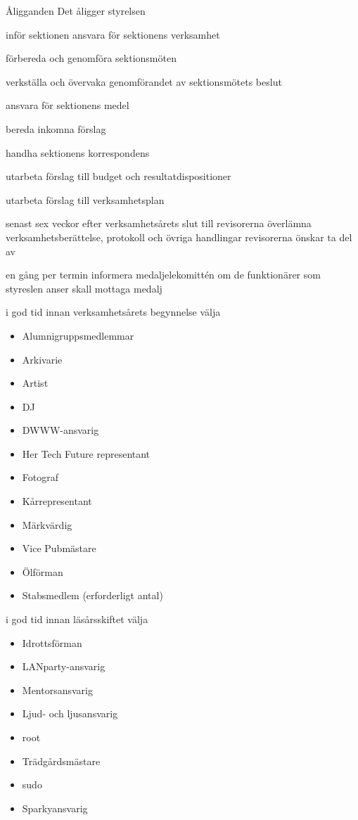 \documentclass[pdfbookmarks,a4paper,11pt]{article}
\newlength{\itemcollength}
\newenvironment{reglemlista}{%
  \begin{list}{}{%
      \setlength{\labelwidth}{\itemcollength}%
      \setlength{\leftmargin}{\labelwidth + \labelsep}%
      \renewcommand{\makelabel}[1]{%
        \raisebox{0pt}[1ex][0pt]{%
          \makebox[\labelwidth][l]{%
            \parbox[t]{\itemcollength}{%
              \raggedright\hspace{0pt}##1}}}\hfill}%
      }}{%
  \end{list}}
\begin{document}
\begin{reglemlista}

	\item[Åligganden]
	Det åligger styrelsen
	\begin{attlista}
		\item inför sektionen ansvara för sektionens verksamhet
		\item förbereda och genomföra sektionsmöten
		\item verkställa och övervaka genomförandet av sektionsmötets beslut
		\item ansvara för sektionens medel
		\item bereda inkomna förslag
		\item handha sektionens korrespondens
		\item utarbeta förslag till budget och resultatdispositioner
		\item utarbeta förslag till verksamhetsplan
		\item senast sex veckor efter verksamhetsårets slut till revisor\-erna överlämna verksamhetsberättelse, protokoll och övriga handlingar revisorerna önskar ta del av
		\item en gång per termin informera medaljelekomittén om de funktionärer som styreslen anser skall mottaga medalj
		\item i god tid innan verksamhetsårets begynnelse välja
		\begin{itemize}
			\item Alumnigruppsmedlemmar
			\item Arkivarie
			\item Artist
			\item DJ
			\item DWWW-ansvarig
			\item Her Tech Future representant
			\item Fotograf
			\item Kårrepresentant
			\item Märkvärdig
			\item Vice Pubmästare
			\item Ölförman
			\item Stabsmedlem (erforderligt antal)
		\end{itemize}
		\item i god tid innan läsårsskiftet välja
		\begin{itemize}
			\item Idrottsförman
			\item LANparty-ansvarig
			\item Mentorsansvarig
			\item Ljud- och ljusansvarig
			\item root
			\item Trädgårdsmästare
			\item sudo
			\item Sparkyansvarig
		\end{itemize}
	\end{attlista}


\end{reglemlista}
\end{document}
